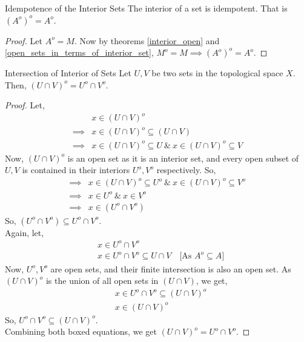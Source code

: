 \begin{Theorem}{Idempotence of the Interior Sets}\label{idempotent_interror}
    The interior of a set is idempotent. That is $(A^o)^o=A^o$.
\end{Theorem}
\begin{proof}
    Let $A^o=M$. Now by theorems \eqref{interior_open} and \eqref{open_sets_in_terms_of_interior_set}, $M^o=M\implies (A^o)^o=A^o$.
\end{proof}
\begin{Theorem}{Intersection of Interior of Sets}\label{intersection_interior}
    Let $U, V$ be two sets in the topological space $X$. Then, $(U\cap V)^o=U^o\cap V^o$.
\end{Theorem}
\begin{proof}
    Let,
    \begin{align*}
        & x\in(U\cap V)^o \\
        \implies& x\in(U\cap V)^o\subseteq (U\cap V) \\
        \implies& x\in(U\cap V)^o\subseteq U\ \&\ x\in(U\cap V)^o\subseteq V
    \end{align*}
    Now, $(U\cap V)^o$ is an open set as it is an interior set, and every open subset of $U, V$ is contained in their interiors $U^o, V^o$ respectively. So,
    \begin{align*}
        \implies& x\in(U\cap V)^o\subseteq U^o\ \&\ x\in(U\cap V)^o\subseteq V^o \\
        \implies& x\in U^o\ \&\ x\in V^o \\
        \implies& x\in (U^o\cap V^o)
    \end{align*}
    So, $\boxed{(U^o\cap V^o)\subseteq U^o\cap V^o}$.\\
    Again, let,
    \begin{align*}
        & x\in U^o\cap V^o \\
        & x\in U^o\cap V^o \subseteq U\cap V\quad\text{[As $A^o\subseteq A$]}
    \end{align*}
    Now, $U^o, V^o$ are open sets, and their finite intersection is also an open set. As $(U\cap V)^o$ is the union of all open sets in $(U\cap V)$, we get,
    \begin{align*}
        & x\in U^o\cap V^o \subseteq (U\cap V)^o \\
        & x\in (U\cap V)^o
    \end{align*}
    So, $\boxed{U^o\cap V^o\subseteq(U\cap V)^o}$.\\
    Combining both boxed equations, we get $(U\cap V)^o=U^o\cap V^o$.
\end{proof}
